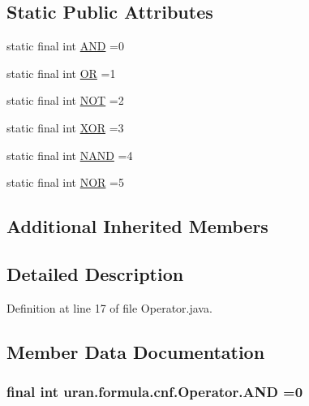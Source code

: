 \subsection*{Static Public Attributes}
\begin{DoxyCompactItemize}
\item 
static final int \hyperlink{classuran_1_1formula_1_1cnf_1_1_operator_a9bee6266cf9d7e2d096db33f4750c9fb}{A\+N\+D} =0
\item 
static final int \hyperlink{classuran_1_1formula_1_1cnf_1_1_operator_a7eeacb98b5e73c0caf9a889a7afcea42}{O\+R} =1
\item 
static final int \hyperlink{classuran_1_1formula_1_1cnf_1_1_operator_ac5089b57e3d7cf6e5bb6e10e2d294c10}{N\+O\+T} =2
\item 
static final int \hyperlink{classuran_1_1formula_1_1cnf_1_1_operator_a0925040ebdb1c6b2ce586ec42212797a}{X\+O\+R} =3
\item 
static final int \hyperlink{classuran_1_1formula_1_1cnf_1_1_operator_a8bdc77e0c28cfc549be4294e6ea28cbb}{N\+A\+N\+D} =4
\item 
static final int \hyperlink{classuran_1_1formula_1_1cnf_1_1_operator_a54f41b26960fc82d4248547d293c8989}{N\+O\+R} =5
\end{DoxyCompactItemize}
\subsection*{Additional Inherited Members}


\subsection{Detailed Description}


Definition at line 17 of file Operator.\+java.



\subsection{Member Data Documentation}
\hypertarget{classuran_1_1formula_1_1cnf_1_1_operator_a9bee6266cf9d7e2d096db33f4750c9fb}{}
\subsubsection[{A\+N\+D}]{\setlength{\rightskip}{0pt plus 5cm}final int uran.\+formula.\+cnf.\+Operator.\+A\+N\+D =0\hspace{0.3cm}{\ttfamily [static]}}\label{classuran_1_1formula_1_1cnf_1_1_operator_a9bee6266cf9d7e2d096db33f4750c9fb}



